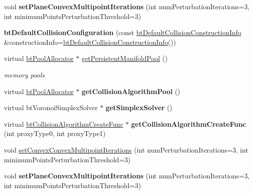 \begin{DoxyCompactItemize}
\mbox{\label{classbtDefaultCollisionConfiguration_a6fc572f229c7be3acd22b320b94a26a5}} 
void {\bfseries set\+Plane\+Convex\+Multipoint\+Iterations} (int num\+Perturbation\+Iterations=3, int minimum\+Points\+Perturbation\+Threshold=3)
\item 
\mbox{\label{classbtDefaultCollisionConfiguration_ad08e7d72b0bd0d3f98290c2a1649b0d9}} 
{\bfseries bt\+Default\+Collision\+Configuration} (const \hyperlink{structbtDefaultCollisionConstructionInfo}{bt\+Default\+Collision\+Construction\+Info} \&construction\+Info=\hyperlink{structbtDefaultCollisionConstructionInfo}{bt\+Default\+Collision\+Construction\+Info}())
\item 
\mbox{\label{classbtDefaultCollisionConfiguration_a5c11b78fe16465a5f6ea4e61af10265b}} 
virtual \hyperlink{classbtPoolAllocator}{bt\+Pool\+Allocator} $\ast$ \hyperlink{classbtDefaultCollisionConfiguration_a5c11b78fe16465a5f6ea4e61af10265b}{get\+Persistent\+Manifold\+Pool} ()
\begin{DoxyCompactList}\small\item\em memory pools \end{DoxyCompactList}\item 
\mbox{\label{classbtDefaultCollisionConfiguration_a4421def5c3353a85b1eec2761a240d66}} 
virtual \hyperlink{classbtPoolAllocator}{bt\+Pool\+Allocator} $\ast$ {\bfseries get\+Collision\+Algorithm\+Pool} ()
\item 
\mbox{\label{classbtDefaultCollisionConfiguration_a2c4d92c742d3bf6d4aac9262dbf772cb}} 
virtual bt\+Voronoi\+Simplex\+Solver $\ast$ {\bfseries get\+Simplex\+Solver} ()
\item 
\mbox{\label{classbtDefaultCollisionConfiguration_ac6a7576d55f094f30e1a326c5b958413}} 
virtual \hyperlink{structbtCollisionAlgorithmCreateFunc}{bt\+Collision\+Algorithm\+Create\+Func} $\ast$ {\bfseries get\+Collision\+Algorithm\+Create\+Func} (int proxy\+Type0, int proxy\+Type1)
\item 
void \hyperlink{classbtDefaultCollisionConfiguration_a39a173eedf0e8d55dd89ef3b637925a9}{set\+Convex\+Convex\+Multipoint\+Iterations} (int num\+Perturbation\+Iterations=3, int minimum\+Points\+Perturbation\+Threshold=3)
\item 
\mbox{\label{classbtDefaultCollisionConfiguration_a6fc572f229c7be3acd22b320b94a26a5}} 
void {\bfseries set\+Plane\+Convex\+Multipoint\+Iterations} (int num\+Perturbation\+Iterations=3, int minimum\+Points\+Perturbation\+Threshold=3)
\end{DoxyCompactItemize}
